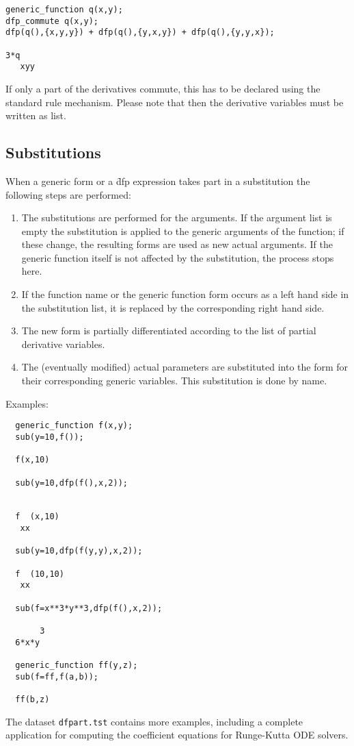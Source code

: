 \begin{verbatim}
generic_function q(x,y);
dfp_commute q(x,y);
dfp(q(),{x,y,y}) + dfp(q(),{y,x,y}) + dfp(q(),{y,y,x});

3*q
   xyy
\end{verbatim}

If only a part of the derivatives commute, this has to be
declared using the standard {\REDUCE} rule mechanism. Please
note that then the derivative variables must be written as
list.

\subsection{Substitutions}

When a generic form or a \f{dfp} expression takes part in a 
substitution the following steps are performed:
\begin{enumerate}
\item The substitutions are performed for the arguments. If the
argument list is empty the substitution is applied to the
generic arguments of the function; if these change, the resulting
forms are used as new actual arguments.
If the generic function itself is not affected by the substitution,
the process stops here.
\item If the function name or the generic function
form occurs as a left hand side in the substitution list,
it is replaced by the corresponding right hand side.
\item The new form is partially differentiated according to the
list of partial derivative variables.
\item The (eventually modified) actual parameters are substituted
into the form for their corresponding generic variables.
This substitution is done by name.
\end{enumerate}

Examples:
\begin{verbatim}
  generic_function f(x,y);
  sub(y=10,f());
 
  f(x,10)

  sub(y=10,dfp(f(),x,2));


  f  (x,10)
   xx

  sub(y=10,dfp(f(y,y),x,2));

  f  (10,10)
   xx

  sub(f=x**3*y**3,dfp(f(),x,2));

       3
  6*x*y

  generic_function ff(y,z);
  sub(f=ff,f(a,b));

  ff(b,z)
\end{verbatim}

The dataset \texttt{dfpart.tst} contains more examples,
including a complete application for computing the coefficient
equations for Runge-Kutta ODE solvers.

